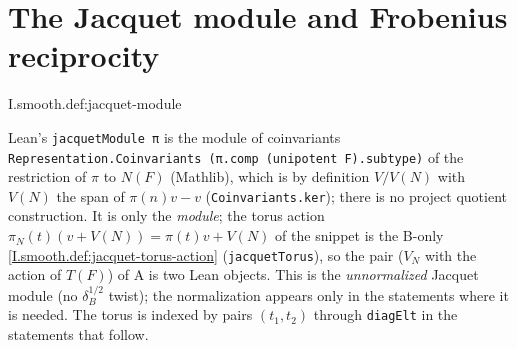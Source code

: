 \section{The Jacquet module and Frobenius reciprocity}

\begin{definition}
\end{definition}
\begin{tfformal}{I.smooth.def:jacquet-module}
\begin{tffidelity}
Lean's \texttt{jacquetModule π} is the module of coinvariants \texttt{Representation.Coinvariants (π.comp (unipotent F).subtype)} of the restriction of $\pi$ to $N(F)$ (Mathlib), which is by definition $V/V(N)$ with $V(N)$ the span of $\pi(n)v-v$ (\texttt{Coinvariants.ker}); there is no project quotient construction. It is only the \emph{module}; the torus action $\pi_N(t)(v+V(N))=\pi(t)v+V(N)$ of the snippet is the B-only \cref{I.smooth.def:jacquet-torus-action} (\texttt{jacquetTorus}), so the pair ($V_N$ with the action of $T(F)$) of A is two Lean objects. This is the \emph{unnormalized} Jacquet module (no $\delta_B^{1/2}$ twist); the normalization appears only in the statements where it is needed. The torus is indexed by pairs $(t_1,t_2)$ through \texttt{diagElt} in the statements that follow.
\end{tffidelity}
\end{tfformal}

